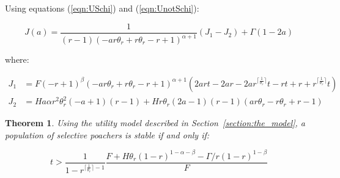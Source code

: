 \documentclass[10pt]{article}
\newtheorem{theorem}{Theorem}
\begin{document}
Using equations (\ref{eqn:USchi}) and (\ref{eqn:UnotSchi}):

\begin{equation}
    J(a) = \frac{1}{\left(r - 1\right) \left(- a r \theta_{r} + r \theta_{r} - r
+ 1\right)^{\alpha + 1}} \left(J_1 - J_2 \right) + \Gamma(1 - 2a)\end{equation}

where:

\begin{align}
    J_1 & = F \left(- r + 1\right)^{\beta} \left(- a r \theta_{r} + r \theta_{r}
    - r + 1\right)^{\alpha + 1} \left(2 a r t - 2 a r - 2 a
r^{\lceil{\frac{1}{\theta_{r}}}\rceil} t - r t + r +
r^{\lceil{\frac{1}{\theta_{r}}}\rceil} t\right)\\
    J_2 & = H a \alpha r^{2} \theta_{r}^{2} \left(- a + 1\right) \left(r - 1\right) + H r \theta_{r} \left(2 a - 1\right) \left(r - 1\right) \left(a r \theta_{r} - r \theta_{r} + r - 1\right)
\end{align}


\begin{theorem}\label{theorem:selective}
Using the utility model described in Section~\ref{section:the_model},
a population of selective poachers is stable if and only if:

\begin{equation}
    t > \frac{1}{1 - r^{\lceil{\frac{1}{\theta_{r}}}\rceil - 1}}
    \frac{F + H \theta_{r} (1 - r) ^{1- \alpha -\beta}-\Gamma/r(1-r)^{1-\beta}}{F}
\end{equation}
\end{theorem}
\end{document}
